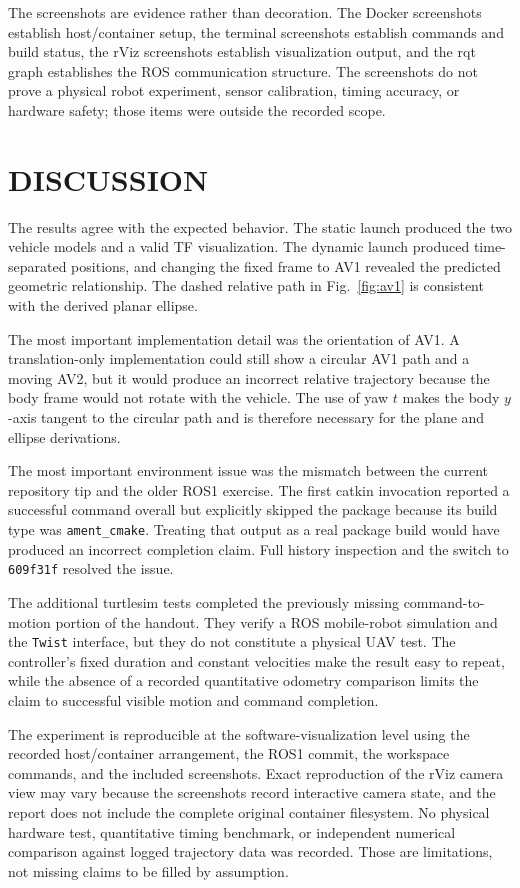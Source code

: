 \documentclass[letterpaper, 10 pt, conference]{ieeeconf}
\begin{document}
The screenshots are evidence rather than decoration. The Docker screenshots establish host/container setup, the terminal screenshots establish commands and build status, the rViz screenshots establish visualization output, and the rqt graph establishes the ROS communication structure. The screenshots do not prove a physical robot experiment, sensor calibration, timing accuracy, or hardware safety; those items were outside the recorded scope.

\section{DISCUSSION}
\label{sec:discussion}
The results agree with the expected behavior. The static launch produced the two vehicle models and a valid TF visualization. The dynamic launch produced time-separated positions, and changing the fixed frame to AV1 revealed the predicted geometric relationship. The dashed relative path in Fig.~\ref{fig:av1} is consistent with the derived planar ellipse.

The most important implementation detail was the orientation of AV1. A translation-only implementation could still show a circular AV1 path and a moving AV2, but it would produce an incorrect relative trajectory because the body frame would not rotate with the vehicle. The use of yaw \(t\) makes the body \(y\)-axis tangent to the circular path and is therefore necessary for the plane and ellipse derivations.

The most important environment issue was the mismatch between the current repository tip and the older ROS1 exercise. The first catkin invocation reported a successful command overall but explicitly skipped the package because its build type was \texttt{ament\_cmake}. Treating that output as a real package build would have produced an incorrect completion claim. Full history inspection and the switch to \texttt{609f31f} resolved the issue.

The additional turtlesim tests completed the previously missing command-to-motion portion of the handout. They verify a ROS mobile-robot simulation and the \texttt{Twist} interface, but they do not constitute a physical UAV test. The controller's fixed duration and constant velocities make the result easy to repeat, while the absence of a recorded quantitative odometry comparison limits the claim to successful visible motion and command completion.

The experiment is reproducible at the software-visualization level using the recorded host/container arrangement, the ROS1 commit, the workspace commands, and the included screenshots. Exact reproduction of the rViz camera view may vary because the screenshots record interactive camera state, and the report does not include the complete original container filesystem. No physical hardware test, quantitative timing benchmark, or independent numerical comparison against logged trajectory data was recorded. Those are limitations, not missing claims to be filled by assumption.
\end{document}
